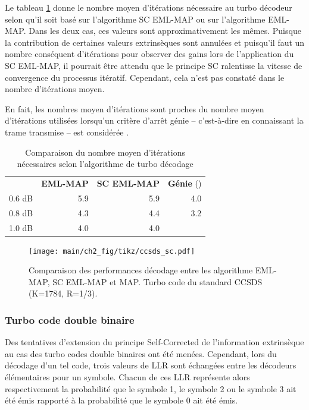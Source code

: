 Le tableau \ref{tab:itmoy} donne le nombre moyen d'itérations nécessaire au turbo décodeur selon qu'il soit basé sur 
l'algorithme SC EML-MAP ou sur l'algorithme EML-MAP. Dans les deux cas, ces valeurs sont approximativement les mêmes. 
Puisque la contribution de certaines valeurs extrinsèques sont annulées et puisqu'il faut un nombre conséquent d'itérations 
pour observer des gains lors de l'application du SC EML-MAP, il pourrait être attendu que le principe SC ralentisse la vitesse 
de convergence du processus itératif. Cependant, cela n'est pas constaté dans le nombre d'itérations moyen.

En fait, les nombres moyen d'itérations sont proches du nombre moyen d'itérations utilisées lorsqu'un critère d'arrêt 
génie -- c'est-à-dire en connaissant la trame transmise -- est considérée \cite{matache2000stopping}.
\begin{table}[!h]
	\centering
	\renewcommand{\arraystretch}{.9}
	\begin{tabular}{lrrr}
		\toprule
		    & \textbf{EML-MAP} & \textbf{SC EML-MAP} & \textbf{Génie} (\cite{matache2000stopping})\\ 
		 \cmidrule(l){2-2} \cmidrule(l){3-3} \cmidrule(l){4-4} 
		0.6 dB & 5.9 &  5.9 & 4.0\\
		0.8 dB & 4.3 & 4.4 & 3.2\\
		1.0 dB & 4.0 & 4.0 & \\
		\bottomrule
	\end{tabular}
	\caption{Comparaison du nombre moyen d’itérations nécessaires selon l'algorithme de turbo décodage}
	\label{tab:itmoy}
\end{table}

\begin{figure}[tb]
	\centering
	\texttt{[image: main/ch2\_fig/tikz/ccsds\_sc.pdf]}
	\vspace*{.3cm}
	\caption{\label{fig:ccsds_sc}Comparaison des performances décodage entre les algorithme EML-MAP, SC EML-MAP et MAP. Turbo code du standard CCSDS (K=1784, R=1/3).}
\end{figure}


\subsubsection{Turbo code double binaire}
Des tentatives d'extension du principe Self-Corrected de l'information extrinsèque au cas des turbo codes double binaires 
ont été menées. Cependant, lors du décodage d'un tel code, trois valeurs de LLR sont échangées entre les décodeurs 
élémentaires pour un symbole. Chacun de ces LLR représente alors respectivement la probabilité que le symbole 1, le symbole 
2 ou le symbole 3 ait été émis rapporté à la probabilité que le symbole 0 ait été émis. 

